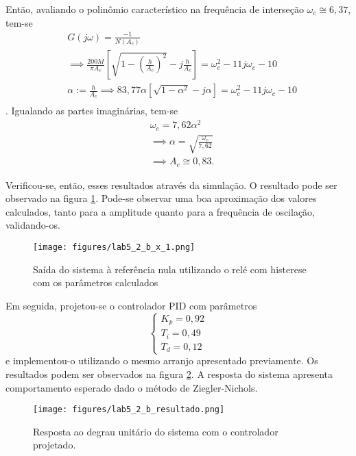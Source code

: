 \documentclass[a4paper]{report}
\begin{document}
Então, avaliando o polinômio característico na frequência de interseção $\omega_c \cong 6,37$, tem-se
\begin{align*}
    &G(j\omega) = \frac{-1}{N(A_c)} \\
    &\implies \frac{200M}{\pi A_c}\left[\sqrt{1-\left( \frac{h}{A_c} \right)^2 } -j \frac{h}{A_c} \right] = \omega_c^2 - 11j\omega_c - 10 \\
    &\alpha := \frac{h}{A_c} \implies 83,77 \alpha \left[\sqrt{1-\alpha^2 } -j \alpha \right] = \omega_c^2 - 11j\omega_c - 10 \\
\end{align*}
. Igualando as partes imaginárias, tem-se
\begin{align*}
    &\omega_c = 7,62 \alpha^2 \\
    &\implies \alpha = \sqrt{\frac{\omega_c}{7,62}} \\
    &\implies A_c \cong 0,83
.\end{align*}

Verificou-se, então, esses resultados através da simulação. O resultado pode ser observado na figura \ref{fig:figures-lab5_2_b_x_1-png}. Pode-se observar uma boa aproximação dos valores calculados, tanto para a amplitude quanto para a frequência de oscilação, validando-os.

\begin{figure}[H]
    \centering
    \texttt{[image: figures/lab5\_2\_b\_x\_1.png]}
    \caption{Saída do sistema à referência nula utilizando o relé com histerese com os parâmetros calculados}
    \label{fig:figures-lab5_2_b_x_1-png}
\end{figure}

Em seguida, projetou-se o controlador PID com parâmetros \[
\begin{cases}
    K_p = 0,92 \\
    T_i = 0,49 \\
    T_d = 0,12
\end{cases}
\] e implementou-o utilizando o mesmo arranjo apresentado previamente. Os resultados podem ser observados na figura \ref{fig:figures-lab5_2_b_resultado-png}. A resposta do sistema apresenta comportamento esperado dado o método de Ziegler-Nichols.

\begin{figure}[H]
    \centering
    \texttt{[image: figures/lab5\_2\_b\_resultado.png]}
    \caption{Resposta ao degrau unitário do sistema com o controlador projetado.}
    \label{fig:figures-lab5_2_b_resultado-png}
\end{figure}
\end{document}
